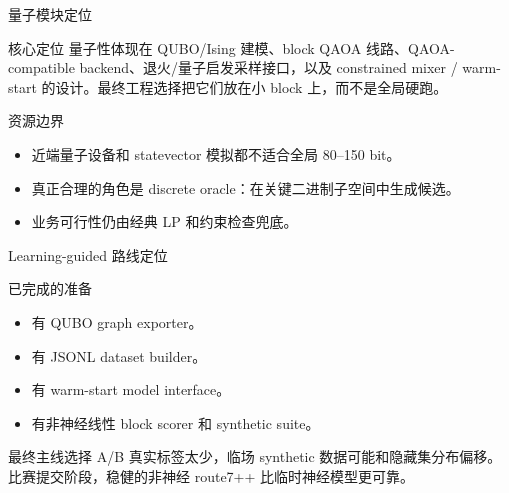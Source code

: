\documentclass[aspectratio=169]{beamer}
\begin{document}
\begin{frame}{量子模块定位}
\small
\begin{alertblock}{核心定位}
量子性体现在 QUBO/Ising 建模、block QAOA 线路、QAOA-compatible backend、退火/量子启发采样接口，以及 constrained mixer / warm-start 的设计。最终工程选择把它们放在小 block 上，而不是全局硬跑。
\end{alertblock}
\begin{block}{资源边界}
\begin{itemize}
  \item 近端量子设备和 statevector 模拟都不适合全局 80--150 bit。
  \item 真正合理的角色是 discrete oracle：在关键二进制子空间中生成候选。
  \item 业务可行性仍由经典 LP 和约束检查兜底。
\end{itemize}
\end{block}
\end{frame}

\begin{frame}{Learning-guided 路线定位}
\small
\begin{block}{已完成的准备}
\begin{itemize}
  \item 有 QUBO graph exporter。
  \item 有 JSONL dataset builder。
  \item 有 warm-start model interface。
  \item 有非神经线性 block scorer 和 synthetic suite。
\end{itemize}
\end{block}
\begin{alertblock}{最终主线选择}
A/B 真实标签太少，临场 synthetic 数据可能和隐藏集分布偏移。比赛提交阶段，稳健的非神经 route7++ 比临时神经模型更可靠。
\end{alertblock}
\end{frame}
\end{document}
